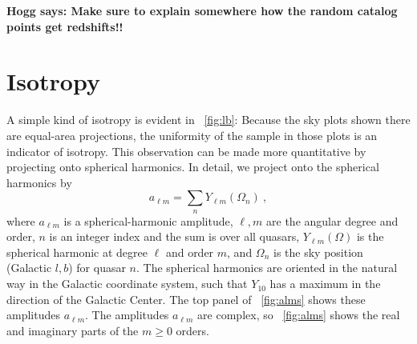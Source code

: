 \documentclass[modern]{aastex631}
\newcommand{\figref}[1]{\figurename~\ref{#1}}
\newcommand{\hogg}[1]{\textbf{Hogg says: #1}}
\begin{document}
\hogg{Make sure to explain somewhere how the random catalog points get redshifts!!}

\section{Isotropy}\label{sec:iso}\noindent
A simple kind of isotropy is evident in \figref{fig:lb}:
Because the sky plots shown there are equal-area projections, the uniformity of the sample in those plots is an indicator of isotropy.
This observation can be made more quantitative by projecting onto spherical harmonics.
In detail, we project onto the spherical harmonics by
\begin{equation}\label{eq:alms}
    a_{\ell m} = \sum_n Y_{\ell m}(\Omega_n) ~,
\end{equation}
where $a_{\ell m}$ is a spherical-harmonic amplitude,
$\ell, m$ are the angular degree and order,
$n$ is an integer index and the sum is over all quasars,
$Y_{\ell m}(\Omega)$ is the spherical harmonic at degree $\ell$ and order $m$,
and
$\Omega_n$ is the sky position (Galactic $l, b$) for quasar $n$.
The spherical harmonics are oriented in the natural way in the Galactic coordinate system, such that $Y_{10}$ has a maximum in the direction of the Galactic Center.
The top panel of \figref{fig:alms} shows these amplitudes $a_{\ell m}$.
The amplitudes $a_{\ell m}$ are complex, so \figref{fig:alms} shows the real and imaginary parts of the $m\geq 0$ orders.
\end{document}
